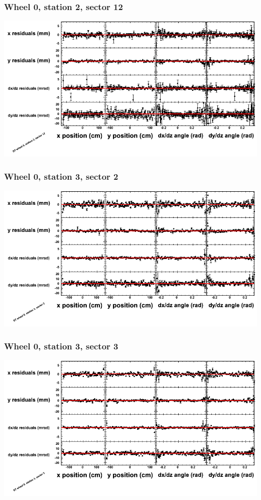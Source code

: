 \documentclass[compress]{beamer}
\begin{document}
\begin{frame}
\frametitle{Wheel 0, station 2, sector 12}
\includegraphics[width=\linewidth]{tmppoly_MBwhCst2sec12.png}
\end{frame}

\begin{frame}
\frametitle{Wheel 0, station 3, sector 2}
\includegraphics[width=\linewidth]{tmppoly_MBwhCst3sec02.png}
\end{frame}

\begin{frame}
\frametitle{Wheel 0, station 3, sector 3}
\includegraphics[width=\linewidth]{tmppoly_MBwhCst3sec03.png}
\end{frame}
\end{document}
